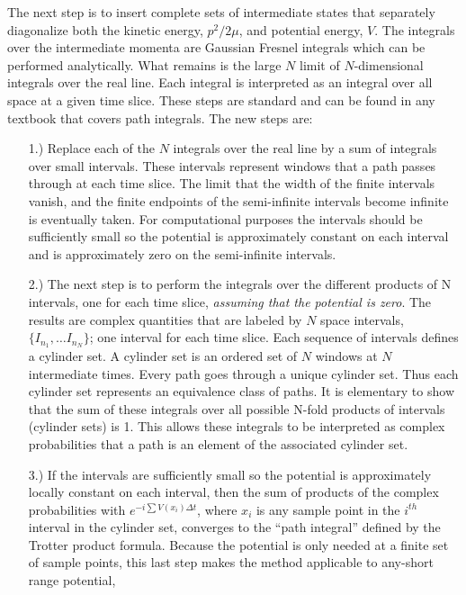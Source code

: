 \documentclass[aps,prc,reprint,noshowpacs,groupedaddress,onecolumn]{revtex4}
\begin{document}
The next step is to insert complete sets of intermediate states that
separately diagonalize both the kinetic energy, $p^2/2\mu$, and
potential energy, $V$.  The integrals over the intermediate momenta
are Gaussian Fresnel integrals which can be performed analytically.
What remains is the large $N$ limit of $N$-dimensional integrals over
the real line. Each integral is interpreted as an integral over all
space at a given time slice.  These steps are standard \cite{Feynman_2}
and can be
found in any textbook that covers path integrals.  The new steps are:
\begin{itemize}

\item[1.)] Replace each of the $N$ integrals over the real line by a sum
  of integrals over small intervals.  These intervals represent
  windows that a path passes through at each time slice.
  The limit that the width of the finite intervals vanish, and the finite
  endpoints of the semi-infinite intervals become infinite is
  eventually taken.  For computational purposes the intervals should
  be sufficiently small so the potential is approximately
  constant on each interval and is approximately zero on the semi-infinite
  intervals.

\item[2.)] The next step is to perform the integrals over the different
  products of N intervals, one for each time slice, {\it assuming that
    the potential is zero}.  The results are complex quantities that
  are labeled by $N$ space intervals, $\{I_{n_1}, \dots I_{n_N}\}$;
  one interval for each time slice.  Each sequence of intervals
  defines a cylinder set.  A cylinder set is an ordered set of $N$
  windows at $N$ intermediate times.  Every path goes
  through a unique cylinder set.  Thus each cylinder set represents an
  equivalence class of paths.  It is elementary to show that the
  sum of these integrals over all possible N-fold products of
  intervals (cylinder sets) is 1.  This allows these integrals to be
  interpreted as complex probabilities that a path is an element of
  the associated cylinder set.

\item[3.)] If the intervals are sufficiently small so the potential is
  approximately locally constant on each interval, then the sum of
  products of the complex probabilities with
  $e^{-i \sum V(x_i) \Delta t}$, where $x_i$ is any sample point in
  the $i^{th}$ interval in the cylinder set, converges to the ``path
  integral'' defined by the Trotter product formula.  Because the potential is
  only needed at a finite set of sample points, this last step makes
  the method applicable to any-short range potential,

\end{itemize}
\end{document}
